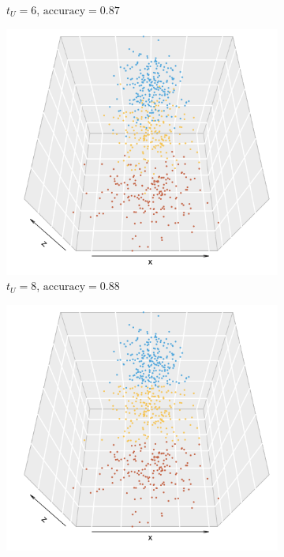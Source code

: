 \documentclass[10pt,journal,compsoc]{IEEEtran}
\numberwithin{equation}{section}
\begin{document}
\begin{figure}[htbp]
\begin{subfigure}{.49\columnwidth}
\caption{$t_U = 6$, $\text{accuracy} = 0.87$}
\label{12:3}
\end{subfigure}
\begin{subfigure}{.49\columnwidth}
\includegraphics[width=\columnwidth]{svd_8.png}%
\caption{$t_U = 8$, $\text{accuracy} = 0.88$}
\end{subfigure}
\begin{subfigure}{.49\columnwidth}
\includegraphics[width=\columnwidth]{svd_8_kmeans.png}%

\end{subfigure}
\end{figure}
\end{document}
